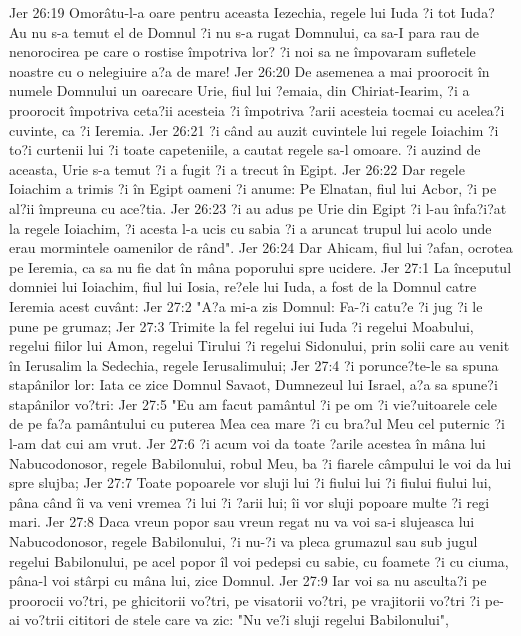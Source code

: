 Jer 26:19  Omorâtu-l-a oare pentru aceasta Iezechia, regele lui Iuda ?i tot Iuda? Au nu s-a temut el de Domnul ?i nu s-a rugat Domnului, ca sa-I para rau de nenorocirea pe care o rostise împotriva lor? ?i noi sa ne împovaram sufletele noastre cu o nelegiuire a?a de mare!
Jer 26:20  De asemenea a mai proorocit în numele Domnului un oarecare Urie, fiul lui ?emaia, din Chiriat-Iearim, ?i a proorocit împotriva ceta?ii acesteia ?i împotriva ?arii acesteia tocmai cu acelea?i cuvinte, ca ?i Ieremia.
Jer 26:21  ?i când au auzit cuvintele lui regele Ioiachim ?i to?i curtenii lui ?i toate capeteniile, a cautat regele sa-l omoare. ?i auzind de aceasta, Urie s-a temut ?i a fugit ?i a trecut în Egipt.
Jer 26:22  Dar regele Ioiachim a trimis ?i în Egipt oameni ?i anume: Pe Elnatan, fiul lui Acbor, ?i pe al?ii împreuna cu ace?tia.
Jer 26:23  ?i au adus pe Urie din Egipt ?i l-au înfa?i?at la regele Ioiachim, ?i acesta l-a ucis cu sabia ?i a aruncat trupul lui acolo unde erau mormintele oamenilor de rând".
Jer 26:24  Dar Ahicam, fiul lui ?afan, ocrotea pe Ieremia, ca sa nu fie dat în mâna poporului spre ucidere.
Jer 27:1  La începutul domniei lui Ioiachim, fiul lui Iosia, re?ele lui Iuda, a fost de la Domnul catre Ieremia acest cuvânt:
Jer 27:2  "A?a mi-a zis Domnul: Fa-?i catu?e ?i jug ?i le pune pe grumaz;
Jer 27:3  Trimite la fel regelui iui Iuda ?i regelui Moabului, regelui fiilor lui Amon, regelui Tirului ?i regelui Sidonului, prin solii care au venit în Ierusalim la Sedechia, regele Ierusalimului;
Jer 27:4  ?i porunce?te-le sa spuna stapânilor lor: Iata ce zice Domnul Savaot, Dumnezeul lui Israel, a?a sa spune?i stapânilor vo?tri:
Jer 27:5  "Eu am facut pamântul ?i pe om ?i vie?uitoarele cele de pe fa?a pamântului cu puterea Mea cea mare ?i cu bra?ul Meu cel puternic ?i l-am dat cui am vrut.
Jer 27:6  ?i acum voi da toate ?arile acestea în mâna lui Nabucodonosor, regele Babilonului, robul Meu, ba ?i fiarele câmpului le voi da lui spre slujba;
Jer 27:7  Toate popoarele vor sluji lui ?i fiului lui ?i fiului fiului lui, pâna când îi va veni vremea ?i lui ?i ?arii lui; îi vor sluji popoare multe ?i regi mari.
Jer 27:8  Daca vreun popor sau vreun regat nu va voi sa-i slujeasca lui Nabucodonosor, regele Babilonului, ?i nu-?i va pleca grumazul sau sub jugul regelui Babilonului, pe acel popor îl voi pedepsi cu sabie, cu foamete ?i cu ciuma, pâna-l voi stârpi cu mâna lui, zice Domnul.
Jer 27:9  Iar voi sa nu asculta?i pe proorocii vo?tri, pe ghicitorii vo?tri, pe visatorii vo?tri, pe vrajitorii vo?tri ?i pe-ai vo?trii cititori de stele care va zic: "Nu ve?i sluji regelui Babilonului",
